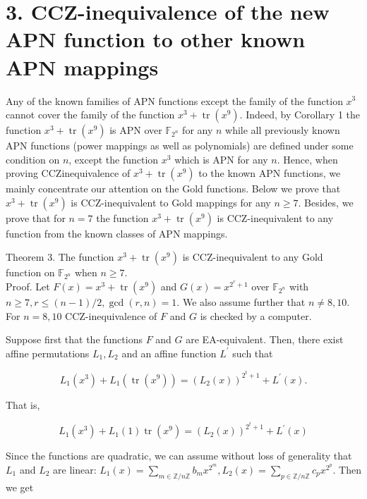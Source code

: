 \documentclass[10pt]{article}
\begin{document}
\section*{3. CCZ-inequivalence of the new APN function to other known APN mappings}
Any of the known families of APN functions except the family of the function $x^{3}$ cannot cover the family of the function $x^{3}+\operatorname{tr}\left(x^{9}\right)$. Indeed, by Corollary 1 the function $x^{3}+\operatorname{tr}\left(x^{9}\right)$ is APN over $\mathbb{F}_{2^{n}}$ for any $n$ while all previously known APN functions (power mappings as well as polynomials) are defined under some condition on $n$, except the function $x^{3}$ which is APN for any $n$. Hence, when proving CCZinequivalence of $x^{3}+\operatorname{tr}\left(x^{9}\right)$ to the known APN functions, we mainly concentrate our attention on the Gold functions. Below we prove that $x^{3}+\operatorname{tr}\left(x^{9}\right)$ is CCZ-inequivalent to Gold mappings for any $n \geqslant 7$. Besides, we prove that for $n=7$ the function $x^{3}+\operatorname{tr}\left(x^{9}\right)$ is CCZ-inequivalent to any function from the known classes of APN mappings.

Theorem 3. The function $x^{3}+\operatorname{tr}\left(x^{9}\right)$ is CCZ-inequivalent to any Gold function on $\mathbb{F}_{2^{n}}$ when $n \geqslant 7$.\\
Proof. Let $F(x)=x^{3}+\operatorname{tr}\left(x^{9}\right)$ and $G(x)=x^{2^{r}+1}$ over $\mathbb{F}_{2^{n}}$ with $n \geqslant 7, r \leqslant(n-1) / 2, \operatorname{gcd}(r, n)=1$. We also assume further that $n \neq 8,10$. For $n=8,10$ CCZ-inequivalence of $F$ and $G$ is checked by a computer.

Suppose first that the functions $F$ and $G$ are EA-equivalent. Then, there exist affine permutations $L_{1}, L_{2}$ and an affine function $L^{\prime}$ such that

$$
L_{1}\left(x^{3}\right)+L_{1}\left(\operatorname{tr}\left(x^{9}\right)\right)=\left(L_{2}(x)\right)^{2^{t}+1}+L^{\prime}(x) .
$$

That is,

$$
L_{1}\left(x^{3}\right)+L_{1}(1) \operatorname{tr}\left(x^{9}\right)=\left(L_{2}(x)\right)^{2^{t}+1}+L^{\prime}(x)
$$

Since the functions are quadratic, we can assume without loss of generality that $L_{1}$ and $L_{2}$ are linear: $L_{1}(x)=\sum_{m \in \mathbb{Z} / n \mathbb{Z}} b_{m} x^{2^{m}}, L_{2}(x)=\sum_{p \in \mathbb{Z} / n \mathbb{Z}} c_{p} x^{2^{p}}$. Then we get
\end{document}
